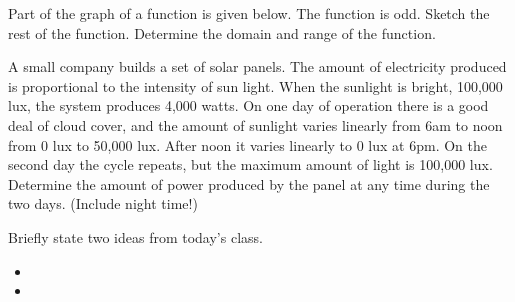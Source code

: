 \begin{problem}
\begin{tikzpicture}[y=1.0cm, x=1.0cm,font=\sffamily]
      \end{tikzpicture}

    \item Part of the graph of a function is given below. The function
      is odd. Sketch the rest of the function. Determine the domain
      and range of the function.


      \clearpage

    \item A small company builds a set of solar panels. The amount of
      electricity produced is proportional to the intensity of sun
      light. When the sunlight is bright, 100,000 lux, the system
      produces 4,000 watts. On one day of operation there is a good
      deal of cloud cover, and the amount of sunlight varies linearly
      from 6am to noon from 0 lux to 50,000 lux. After noon it varies
      linearly to 0 lux at 6pm. On the second day the cycle repeats,
      but the maximum amount of light is 100,000 lux. Determine the
      amount of power produced by the panel at any time during the two
      days. (Include night time!)

      \vfill

\end{problem}

\postClass

\begin{problem}
\item Briefly state two ideas from today's class.
  \begin{itemize}
  \item 
  \item 
  \end{itemize}
\item 
  \begin{subproblem}
    \item
  \end{subproblem}
\end{problem}



